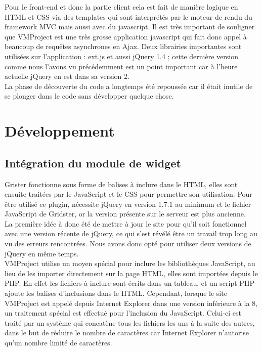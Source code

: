 \documentclass[12pt]{report}
\begin{document}
Pour le front-end et donc la partie client cela est fait de manière logique en HTML et CSS via des templates qui sont interprétés par le moteur de rendu du framework MVC mais aussi avec du javascript. Il est très important de souligner que VMProject est une très grosse application javascript qui fait donc appel à beaucoup de requêtes asynchrones en Ajax. Deux librairies importantes sont utilisées sur l'application : ext.js et aussi jQuery 1.4 ; cette dernière version comme nous l'avons vu précédemment est un point important car à l'heure actuelle jQuery en est dans sa version 2.\\

La phase de découverte du code a longtemps été repoussée car il était inutile de se plonger dans le code sans développer quelque chose.\\
	\section{Développement}
	
	\subsection{Intégration du module de widget}
	
	Grister fonctionne sous forme de balises à inclure dans le HTML, elles sont ensuite traitées par le JavaScript et le CSS pour permettre son utilisation.
Pour être utilisé ce plugin, nécessite jQuery en version 1.7.1 au minimum et le fichier JavaScript de Gridster, or la version présente sur le serveur est plus ancienne.\\
	
	
La première idée à donc été de mettre à jour le site pour qu’il soit fonctionnel avec une version récente de jQuery, ce qui s'est révélé être un travail trop long au vu des erreurs rencontrées. Nous avons donc opté pour utiliser deux versions de jQuery en même temps.\\
	

VMProject utilise un moyen spécial pour inclure les bibliothèques JavaScript, au lieu de les importer directement sur la page HTML, elles sont importées depuis le PHP. En effet les fichiers à inclure sont écrits dans un tableau, et un script PHP ajoute les balises d’inclusions dans le HTML. Cependant, lorsque le site VMProject est appelé depuis Internet Explorer dans une version inférieure à la 8, un traitement spécial est effectué pour l’inclusion du JavaScript. Celui-ci est traité par un système qui concatène tous les fichiers les uns à la suite des autres, dans le but de réduire le nombre de caractères car Internet Explorer n’autorise qu’un nombre limité de caractères.\\
	
\end{document}
